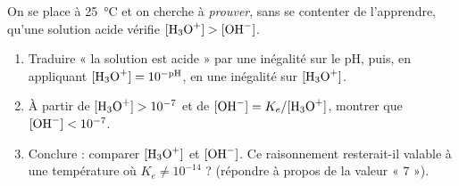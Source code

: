 \documentclass[11pt,a4paper]{article}
\begin{document}
\begin{exobox}
On se place à \SI{25}{\celsius} et on cherche à \emph{prouver}, sans se contenter de l'apprendre, qu'une
solution acide vérifie $[\ce{H3O+}]>[\ce{OH-}]$.
\begin{enumerate}[label=\alph*),leftmargin=1.6em,itemsep=2pt]
  \item Traduire « la solution est acide » par une inégalité sur le $\mathrm{pH}$, puis, en appliquant
        $[\ce{H3O+}]=10^{-\mathrm{pH}}$, en une inégalité sur $[\ce{H3O+}]$.
  \item À partir de $[\ce{H3O+}] > 10^{-7}$ et de $[\ce{OH-}] = K_e/[\ce{H3O+}]$, montrer que
        $[\ce{OH-}] < 10^{-7}$.
  \item Conclure : comparer $[\ce{H3O+}]$ et $[\ce{OH-}]$. Ce raisonnement resterait-il valable à une
        température où $K_e \neq 10^{-14}$ ? (répondre à propos de la valeur « 7 »).
\end{enumerate}
\end{exobox}
\end{document}
